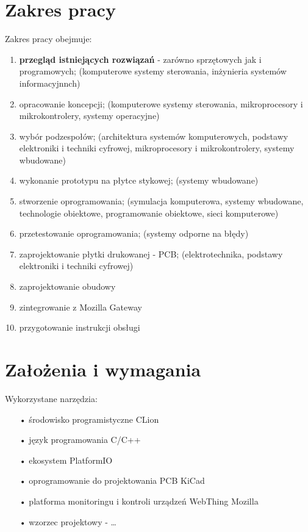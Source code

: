 \documentclass[11pt,a4paper]{report}
\begin{document}
 \section{Zakres pracy}
 Zakres pracy obejmuje:
 \begin{enumerate}
 \item \textbf{przegląd istniejących rozwiązań} - zarówno sprzętowych jak i programowych; (komputerowe systemy sterowania, inżynieria systemów informacyjnnch)
 \item opracowanie koncepcji; (komputerowe systemy sterowania, mikroprocesory i mikrokontrolery, systemy operacyjne)
 \item wybór podzespołów; (architektura systemów komputerowych, podstawy elektroniki i techniki cyfrowej, mikroprocesory i mikrokontrolery, systemy wbudowane)
 \item wykonanie prototypu na płytce stykowej; (systemy wbudowane)
 \item stworzenie oprogramowania; (symulacja komputerowa, systemy wbudowane, technologie obiektowe, programowanie obiektowe, sieci komputerowe)
 \item przetestowanie oprogramowania; (systemy odporne na błędy)
 \item zaprojektowanie płytki drukowanej - PCB; (elektrotechnika, podstawy elektroniki i techniki cyfrowej)
 \item zaprojektowanie obudowy
 \item zintegrowanie z Mozilla Gateway
 \item przygotowanie instrukcji obsługi
 \end{enumerate}
 
 \section{Założenia i wymagania}
 
 Wykorzystane narzędzia:
 \begin{enumerate}
 \item[•] środowisko programistyczne CLion
 \item[•] język programowania C/C++
 \item[•] ekosystem PlatformIO
 \item[•] oprogramowanie do projektowania PCB KiCad
 \item[•] platforma monitoringu i kontroli urządzeń WebThing Mozilla
 \item[•] wzorzec projektowy - \dots
 \end{enumerate}
 
\end{document}
